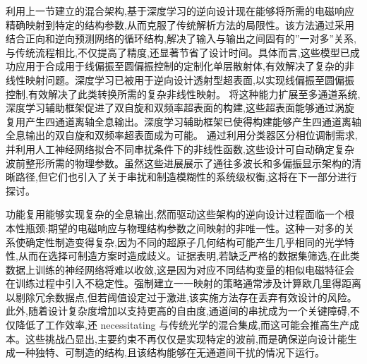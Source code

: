 利用上一节建立的混合架构,基于深度学习的逆向设计现在能够将所需的电磁响应精确映射到特定的结构参数,从而克服了传统解析方法的局限性。该方法通过采用结合正向和逆向预测网络的循环结构,解决了输入与输出之间固有的''一对多''关系,与传统流程相比,不仅提高了精度,还显著节省了设计时间。具体而言,这些模型已成功应用于合成用于线偏振至圆偏振控制的定制化单层散射体,有效解决了复杂的非线性映射问题。深度学习已被用于逆向设计透射型超表面,以实现线偏振至圆偏振控制,有效解决了此类转换所需的复杂非线性映射。\citep{doi_10_1088_1361_6463_acefdf_20072f6c} 将这种能力扩展至多通道系统,深度学习辅助框架促进了双自旋和双频率超表面的构建,这些超表面能够通过涡旋复用产生四通道离轴全息输出。深度学习辅助框架已使得构建能够产生四通道离轴全息输出的双自旋和双频率超表面成为可能。\citep{doi_10_1117_1_apn_2_1_016010_57069347} 通过利用分类器区分相位调制需求,并利用人工神经网络拟合不同串扰条件下的非线性函数,这些设计可自动确定复杂波前整形所需的物理参数。虽然这些进展展示了通往多波长和多偏振显示架构的清晰路径,但它们也引入了关于串扰和制造模糊性的系统级权衡,这将在下一部分进行探讨。\citep{doi_10_1088_1361_6463_acefdf_20072f6c} \citep{doi_10_1117_1_apn_2_1_016010_57069347}

功能复用能够实现复杂的全息输出,然而驱动这些架构的逆向设计过程面临一个根本性瓶颈:期望的电磁响应与物理结构参数之间映射的非唯一性。这种一对多的关系使确定性制造变得复杂,因为不同的超原子几何结构可能产生几乎相同的光学特性,从而在选择可制造方案时造成歧义。证据表明,若缺乏严格的数据集筛选,在此类数据上训练的神经网络将难以收敛,这是因为对应不同结构变量的相似电磁特征会在训练过程中引入不稳定性。强制建立一一映射的策略通常涉及计算欧几里得距离以剔除冗余数据点,但若阈值设定过于激进,该实施方法存在丢弃有效设计的风险。此外,随着设计复杂度增加以支持更高的自由度,通道间的串扰成为一个关键障碍,不仅降低了工作效率,还 necessitating 与传统光学的混合集成,而这可能会推高生产成本。这些挑战凸显出,主要约束不再仅仅是实现特定的波前,而是确保逆向设计能生成一种独特、可制造的结构,且该结构能够在无通道间干扰的情况下运行。\citep{doi_10_1088_1361_6463_ad3e05_d24e0a0a} \citep{doi_10_1515_nanoph_2025_0269_b999ce93} \citep{doi_10_1038_s41467_026_76714_x_8ca5d39b}

